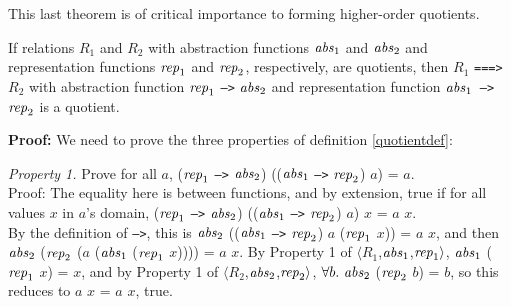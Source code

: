 \documentclass[envcountsame,runningheads]{llncs}
\newcommand{\quotient}{partial equivalence}
\begin{document}
This last theorem is of critical importance to forming higher-order
quotients. 

\begin{theorem}
\label{funquotient}
If relations $R_1$ and $R_2$
with
abstraction functions ${\it abs}_1$ and ${\it abs}_2$
and representation functions ${\it rep}_1$ and ${\it rep}_2$,
respectively,
are quotients,
then $R_1$ {\tt ===>} $R_2$
with
abstraction function ${\it rep}_1$ {\tt -->} ${\it abs}_2$
and representation function
${\it abs}_1$~{\tt -->}~${\it rep}_2$
is a quotient.

\end{theorem}
{\bf Proof:}
We need to prove the three properties of
definition \ref{quotientdef}:

{\it Property 1.} Prove for all $a$, 
(${\it rep}_1$ {\tt -->} ${\it abs}_2$)
((${\it abs}_1$ {\tt -->} ${\it rep}_2$) $a$) = $a$. \\
Proof:
The equality here is between functions, and by extension, true if
for all values $x$ in $a$'s domain,
(${\it rep}_1$ {\tt -->} ${\it abs}_2$)
((${\it abs}_1$ {\tt -->} ${\it rep}_2$) $a$) $x$ = $a$ $x$. \\
By the definition of {\tt -->}, this is
${\it abs}_2$
((${\it abs}_1$ {\tt -->} ${\it rep}_2$) $a$ (${\it rep}_1$ $x$)) = $a$ $x$,
and then
${\it abs}_2$ (${\it rep}_2$ ($a$ (${\it abs}_1$ (${\it rep}_1$ $x$)))) = $a$ $x$. 
By Property 1 of $\langle R_1$,${\it abs}_1$,${\it rep}_1 \rangle$, 
${\it abs}_1$ (${\it rep}_1$ $x$) = $x$, and
by Property 1 of $\langle R_2$,${\it abs}_2$,${\it rep}_2 \rangle$, 
$\forall b.\ {\it abs}_2$ (${\it rep}_2$ $b$) = $b$, so
this reduces to $a$ $x$ = $a$ $x$, true. 
\end{document}
